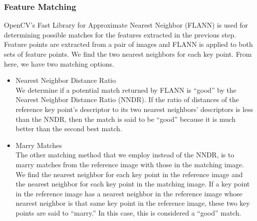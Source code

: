 \subsubsection{Feature Matching}
	OpenCV's Fast Library for Approximate Nearest Neighbor (FLANN) is used for determining possible matches for the features extracted in the previous step. Feature points are extracted from a pair of images and FLANN is applied to both sets of feature points. We find the two nearest neighbors for each key point. From here, we have two matching options. 
\begin{itemize}
\item{Nearest Neighbor Distance Ratio} \\
	We determine if a potential match returned by FLANN is “good” by the Nearest Neighbor Distance Ratio (NNDR). If the ratio of distances of the reference key point's descriptor to its two nearest neighbors' descriptors is less than the NNDR, then the match is said to be “good” because it is much better than the second best match. 
\item{Marry Matches} \\
	The other matching method that we employ instead of the NNDR, is to marry matches from the reference image with those in the matching image. We find the nearest neighbor for each key point in the reference image and the nearest neighbor for each key point in the matching image. If a key point in the reference image has a nearest neighbor in the reference image whose nearest neighbor is that same key point in the reference image, these two key points are said to “marry.” In this case, this is considered a “good” match.
\end{itemize}

